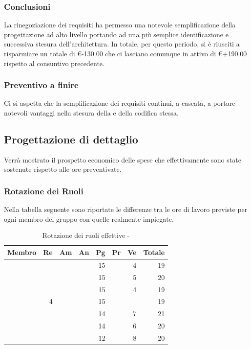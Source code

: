 \documentclass[12pt,a4paper]{article}
\begin{document}
\subsubsection{Conclusioni}
La rinegoziazione dei requisiti ha permesso una notevole semplificazione della progettazione ad alto livello portando ad una più semplice identificazione e successiva stesura dell'architettura. In totale, per questo periodo, si è riusciti a risparmiare un totale di \euro{}-130.00 che ci lasciano comunque in attivo di \euro{}+190.00 rispetto al consuntivo precedente.

\subsubsection{Preventivo a finire}
Ci si aspetta che la semplificazione dei requisiti continui, a cascata, a portare notevoli vantaggi nella stesura della \DP{} e della codifica stessa.

\newpage

\subsection{Progettazione di dettaglio}
Verrà mostrato il prospetto economico delle spese che effettivamente sono state sostenute rispetto alle ore preventivate.

\subsubsection{Rotazione dei Ruoli}
Nella tabella seguente sono riportate le differenze tra le ore di lavoro previste per ogni membro del gruppo con quelle realmente impiegate.

\begin{table}[H]
	\begin{center}
		\begin{tabular}{l r r r r r r r}
			\toprule
			\textbf{Membro}	&	\textbf{Re}	&	\textbf{Am}	& \textbf{An} & \textbf{Pg} & \textbf{Pr} & \textbf{Ve} & \textbf{Totale}\\
			\midrule
			\midrule
			\IB{} & & & & 15 & & 4 & 19 \\
			\midrule
			\AB{} & & & & 15 & & 5 & 20 \\
			\midrule
			\NDC{} & & & & 15 & & 4 & 19 \\
			\midrule
			\TP{} & 4 & & & 15 & & & 19 \\
			\midrule
			\WS{} & & & & 14 & & 7 & 21 \\
			\midrule
			\AVE{} & & & & 14 & & 6 & 20 \\
			\midrule
			\AVI{} & & & & 12 & & 8 & 20 \\
			\bottomrule
		\end{tabular}
		\caption{Rotazione dei ruoli effettive - \FPD{}}
	\end{center}
\end{table}
\end{document}
